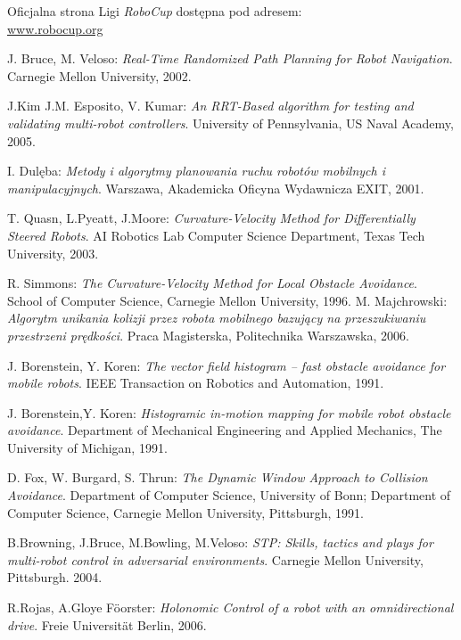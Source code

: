 \begin{thebibliography}{9}
\small
{}
	Oficjalna strona Ligi \textit{RoboCup} dostępna pod adresem:\\
	\url{www.robocup.org}
	
J. Bruce, M. Veloso:
\emph{Real-Time Randomized Path Planning for Robot Navigation}. Carnegie Mellon University, 2002.

J.Kim J.M. Esposito, V. Kumar:
\emph{An RRT-Based algorithm for testing and validating multi-robot controllers}. University of Pennsylvania, US Naval Academy, 2005.

	I. Dulęba:
	\emph{Metody i algorytmy planowania ruchu robotów mobilnych i manipulacyjnych}.
	Warszawa, Akademicka Oficyna Wydawnicza EXIT, 2001.

	T. Quasn, L.Pyeatt, J.Moore:
	\emph{Curvature-Velocity Method for Differentially Steered Robots}.
	AI Robotics Lab
	Computer Science Department,
	Texas Tech University, 2003.

	R. Simmons:
	\emph{The Curvature-Velocity Method for Local Obstacle Avoidance}.
	School of Computer Science,
	Carnegie Mellon University, 1996.
	M. Majchrowski:
	\emph{Algorytm unikania kolizji przez robota mobilnego bazujący na przeszukiwaniu
	przestrzeni prędkości}.
	Praca Magisterska, Politechnika Warszawska, 2006.

	J. Borenstein, Y. Koren:
	\emph{ The vector field histogram -- fast obstacle avoidance for mobile robots}.
	IEEE Transaction on Robotics and Automation, 1991.

	J. Borenstein,Y. Koren:
	\emph{Histogramic in-motion mapping
	for mobile robot obstacle avoidance}.
	Department of Mechanical Engineering and Applied Mechanics,
	The University of Michigan, 1991.

	D. Fox, W. Burgard, S. Thrun:
	\emph{The Dynamic Window Approach to Collision Avoidance}.
	Department of Computer Science, University of Bonn;
	Department of Computer Science, Carnegie Mellon University, Pittsburgh, 1991.
		
	B.Browning, J.Bruce, M.Bowling, M.Veloso:
	\emph{STP: Skills, tactics and plays for multi-robot control
             in adversarial environments}.
	  Carnegie Mellon University, Pittsburgh. 2004.

	R.Rojas, A.Gloye F\"{o}orster:
	\emph{ Holonomic Control of a robot with an omnidirectional
	      drive}.
	  Freie Universität Berlin, 2006.


\end{thebibliography}
